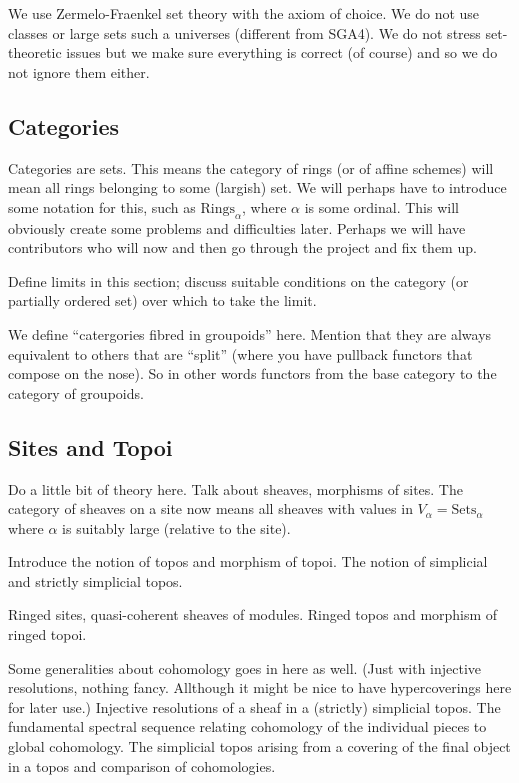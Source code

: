 \documentclass{amsart}
\theoremstyle{definition}
\theoremstyle{remark}
\numberwithin{equation}{subsection}
\begin{document}
\noindent 
We use Zermelo-Fraenkel set theory with the axiom of choice. We do not 
use classes or large sets such a universes (different from SGA4). We do
not stress set-theoretic issues but we make sure everything is correct 
(of course) and so we do not ignore them either.

\subsection{Categories}
\label{subsection-categories}

\noindent
Categories are sets. This means the category of rings (or of affine 
schemes) will mean all rings belonging to some (largish) set. We will 
perhaps have to introduce some notation for this, such as 
$\text{Rings}_\alpha$, where $\alpha$ is some ordinal. This will 
obviously create some problems and difficulties later. Perhaps we
will have contributors who will now and then go through the project and 
fix them up.

\smallskip\noindent
Define limits in this section; discuss suitable conditions on the
category (or partially ordered set) over which to take the limit.

\smallskip\noindent
We define ``catergories fibred in groupoids'' here. Mention that they are
always equivalent to others that are ``split'' (where you have pullback 
functors that compose on the nose). So in other words functors from the base
category to the category of groupoids.

\subsection{Sites and Topoi}
\label{subsection-sites}

\noindent
Do a little bit of theory here. Talk about sheaves, morphisms of sites.
The category of sheaves on a site now means all sheaves with values in
$V_\alpha = \text{Sets}_\alpha$ where $\alpha$ is suitably large (relative
to the site).

Introduce the notion of topos and morphism of topoi. The notion of 
simplicial and strictly simplicial topos.

\smallskip\noindent
Ringed sites, quasi-coherent sheaves of modules. Ringed topos and 
morphism of ringed topoi.

\smallskip\noindent
Some generalities about cohomology goes in here as well. (Just with
injective resolutions, nothing fancy. Allthough it might be nice to
have hypercoverings here for later use.) Injective resolutions of a
sheaf in a (strictly) simplicial topos.  The fundamental spectral 
sequence relating cohomology of the individual pieces to global
cohomology. The simplicial topos arising from a covering of the final
object in a topos and comparison of cohomologies.
\end{document}
